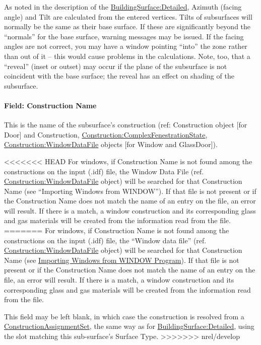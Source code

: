 As noted in the description of the \hyperref[buildingsurfacedetailed]{BuildingSurface:Detailed}, Azimuth (facing angle) and Tilt are calculated from the entered vertices. Tilts of subsurfaces will normally be the same as their base surface. If these are significantly beyond the ``normals'' for the base surface, warning messages may be issued. If the facing angles are not correct, you may have a window pointing ``into'' the zone rather than out of it -- this would cause problems in the calculations. Note, too, that a ``reveal'' (inset or outset) may occur if the plane of the subsurface is not coincident with the base surface; the reveal has an effect on shading of the subsurface.

\paragraph{Field: Construction Name}\label{field-construction-name-20}

This is the name of the subsurface's construction (ref: Construction object {[}for Door{]} and Construction, \hyperref[constructioncomplexfenestrationstate]{Construction:ComplexFenestrationState}, \hyperref[constructionwindowdatafile]{Construction:WindowDataFile} objects {[}for Window and GlassDoor{]}).

<<<<<<< HEAD
For windows, if Construction Name is not found among the constructions on the input (.idf) file, the Window Data File (ref. \hyperref[constructionwindowdatafile]{Construction:WindowDataFile} object) will be searched for that Construction Name (see ``Importing Windows from WINDOW''). If that file is not present or if the Construction Name does not match the name of an entry on the file, an error will result. If there is a match, a window construction and its corresponding glass and gas materials will be created from the information read from the file.
=======
For windows, if Construction Name is not found among the constructions on the input (.idf) file, the ``Window data file'' (ref. \hyperref[constructionwindowdatafile]{Construction:WindowDataFile} object) will be searched for that Construction Name (see \hyperref[importing-windows-from-window-program]{Importing Windows from WINDOW Program}). If that file is not present or if the Construction Name does not match the name of an entry on the file, an error will result. If there is a match, a window construction and its corresponding glass and gas materials will be created from the information read from the file.

This field may be left blank, in which case the construction is resolved from a \hyperref[constructionassignmentset]{ConstructionAssignmentSet}, the same way as for \hyperref[buildingsurfacedetailed]{BuildingSurface:Detailed}, using the slot matching this sub-surface's Surface Type.
>>>>>>> nrel/develop

